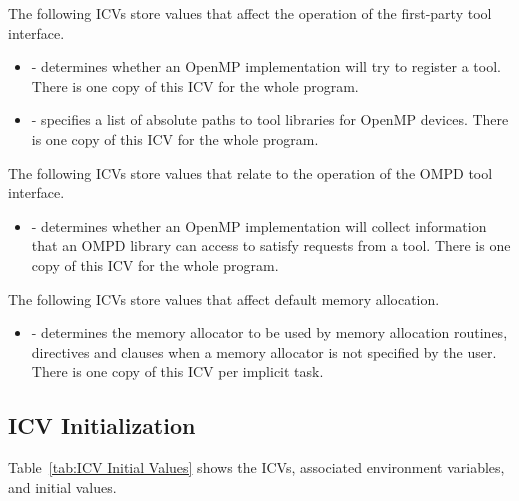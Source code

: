 The following ICVs store values that affect the operation of the
first-party tool interface.

\begin{itemize}

\item {} - determines whether an OpenMP implementation will
try to register a tool.  There is one copy of this ICV for the whole program.

\item {} - specifies a list of absolute paths to tool libraries for OpenMP devices.
There is one copy of this ICV for the whole program.

\end{itemize}

The following ICVs store values that relate to the operation of the
OMPD tool interface.

\begin{itemize}
\item
   - determines whether an OpenMP implementation will collect
  information that an OMPD library can access to satisfy requests from
  a tool.
  There is one copy of this ICV for the whole program.
\end{itemize}

The following ICVs store values that affect default memory allocation.

\begin{itemize}

\item {} - determines the memory allocator to be used by memory allocation routines, directives and clauses when a memory allocator is not specified by the user. There is one copy of this ICV per implicit task.

\end{itemize}




\subsection{ICV Initialization}
\label{subsec:ICV Initialization}
Table~\ref{tab:ICV Initial Values} shows the ICVs, associated
environment variables, and initial values.

